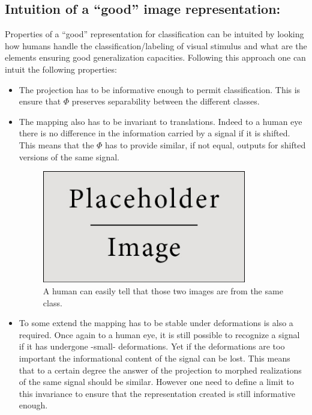\documentclass[a4paper,11pt]{report}
\begin{document}
		\subsection{Intuition of a ``good'' image representation:}
      \label{sec:Intro/Image rep/Intuition}
      
      Properties of a ``good'' representation for classification can be intuited by looking how humans handle the classification/labeling of visual stimulus and what are the elements ensuring good generalization capacities. Following this approach one can intuit the following properties:
      
      
			\begin{itemize}
				\item The projection has to be informative enough to permit classification. This is ensure that $\Phi$ preserves separability between the different classes.\\

				\item The mapping also has to be invariant to translations. Indeed to a human eye there is no difference in the information carried by a signal if it is shifted. This means that the $\Phi$ has to provide similar, if not equal, outputs for shifted versions of the same signal.\\
		
				\begin{figure}
				  \begin{center}
				    \includegraphics[width=3.5in]{placeholder.jpg}
				    \caption[Translation invariance]{A human can easily tell that those two images are from the same class.}
				    \label{fig:Illustration translation invariance}
				  \end{center}
				\end{figure}
	
				\item To some extend the mapping has to be stable under deformations is also a required. Once again to a human eye, it is still possible to recognize a signal if it has undergone -small- deformations. Yet if the deformations are too important the informational content of the signal can be lost. This means that to a certain degree the answer of the projection to morphed realizations of the same signal should be similar. However one need to define a limit to this invariance to ensure that the representation created is still informative enough.\\
				

\end{itemize}
\end{document}
